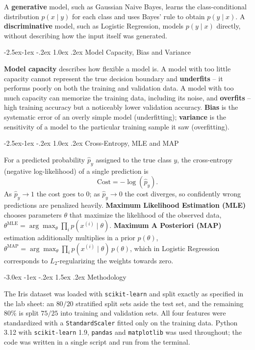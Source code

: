 \documentclass[12pt,a4paper]{article}
\makeatletter
\renewcommand{\section}{\@startsection{section}{1}{\z@}%
  {-3.0ex \@plus -1ex \@minus -.2ex}%
  {1.5ex \@plus.2ex}%
  {\normalfont\Large\bfseries\color{primaryblue}}}
\renewcommand{\subsection}{\@startsection{subsection}{2}{\z@}%
  {-2.5ex\@plus -1ex \@minus -.2ex}%
  {1.0ex \@plus .2ex}%
  {\normalfont\large\bfseries\color{accentblue}}}
\makeatother
\begin{document}
A \textbf{generative} model, such as Gaussian Naive Bayes, learns the class-conditional distribution $p(x \mid y)$ for each class and uses Bayes' rule to obtain $p(y \mid x)$. A \textbf{discriminative} model, such as Logistic Regression, models $p(y \mid x)$ directly, without describing how the input itself was generated.

\subsection{Model Capacity, Bias and Variance}

\textbf{Model capacity} describes how flexible a model is. A model with too little capacity cannot represent the true decision boundary and \textbf{underfits} -- it performs poorly on both the training and validation data. A model with too much capacity can memorize the training data, including its noise, and \textbf{overfits} -- high training accuracy but a noticeably lower validation accuracy. \textbf{Bias} is the systematic error of an overly simple model (underfitting); \textbf{variance} is the sensitivity of a model to the particular training sample it saw (overfitting).

\subsection{Cross-Entropy, MLE and MAP}

For a predicted probability $\hat p_y$ assigned to the true class $y$, the cross-entropy (negative log-likelihood) of a single prediction is
\[
  \mathrm{Cost} = -\log(\hat p_y).
\]
As $\hat p_y \to 1$ the cost goes to $0$; as $\hat p_y \to 0$ the cost diverges, so confidently wrong predictions are penalized heavily. \textbf{Maximum Likelihood Estimation (MLE)} chooses parameters $\theta$ that maximize the likelihood of the observed data, $\theta^{\mathrm{MLE}} = \arg\max_\theta \prod_i p(x^{(i)}\mid\theta)$. \textbf{Maximum A Posteriori (MAP)} estimation additionally multiplies in a prior $p(\theta)$, $\theta^{\mathrm{MAP}} = \arg\max_\theta \prod_i p(x^{(i)}\mid\theta)\,p(\theta)$, which in Logistic Regression corresponds to $L_2$-regularizing the weights towards zero.

\section{Methodology}

The Iris dataset was loaded with \texttt{scikit-learn} and split exactly as specified in the lab sheet: an $80/20$ stratified split sets aside the test set, and the remaining $80\%$ is split $75/25$ into training and validation sets. All four features were standardized with a \texttt{StandardScaler} fitted only on the training data. Python 3.12 with \texttt{scikit-learn} 1.9, \texttt{pandas} and \texttt{matplotlib} was used throughout; the code was written in a single script and run from the terminal.
\end{document}
